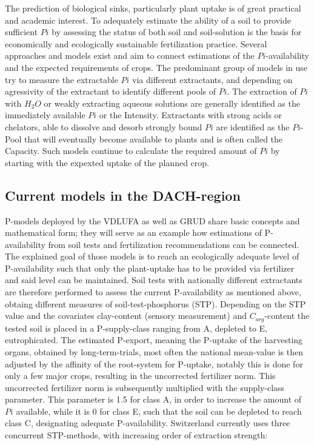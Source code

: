 \documentclass[
  letterpaper,
  DIV=11,
  numbers=noendperiod]{scrartcl}
\begin{document}
The prediction of biological sinks, particularly plant uptake is of
great practical and academic interest. To adequately estimate the
ability of a soil to provide sufficient \(Pi\) by assessing the status
of both soil and soil-solution is the basis for economically and
ecologically sustainable fertilization practice. Several approaches and
models exist and aim to connect estimations of the \(Pi\)-availability
and the expected requirements of crops. The predominant group of models
in use try to measure the extractable \(Pi\) via different extractants,
and depending on agressivity of the extractant to identify different
pools of \(Pi\). The extraction of \(Pi\) with \(H_2O\) or weakly
extracting aqueous solutions are generally identified as the immediately
available \(Pi\) or the Intensity. Extractants with strong acids or
chelators, able to dissolve and desorb strongly bound \(Pi\) are
identified as the \(Pi\)-Pool that will eventually become available to
plants and is often called the Capacity. Such models continue to
calculate the required amount of \(Pi\) by starting with the expexted
uptake of the planned crop.

\subsection{Current models in the
DACH-region}\label{current-models-in-the-dach-region}

P-models deployed by the VDLUFA as well as GRUD share basic concepts and
mathematical form; they will serve as an example how estimations of
P-availability from soil tests and fertilization recommendations can be
connected. The explained goal of those models is to reach an
ecologically adequate level of P-availability such that only the
plant-uptake has to be provided via fertilizer and said level can be
maintained. Soil tests with nationally different extractants are
therefore performed to assess the current P-availability as mentioned
above, obtaing different measures of soil-test-phosphorus (STP).
Depending on the STP value and the covariates clay-content (sensory
measurement) and \(C_{org}\)-content the tested soil is placed in a
P-supply-class ranging from A, depleted to E, eutrophicated. The
estimated P-export, meaning the P-uptake of the harvesting organs,
obtained by long-term-trials, most often the national mean-value is then
adjusted by the affinity of the root-system for P-uptake, notably this
is done for only a few major crops, resulting in the uncorrected
fertilizer norm. This uncorrected fertilizer norm is subsequently
multiplied with the supply-class parameter. This parameter is 1.5 for
class A, in order to increase the amount of \(Pi\) available, while it
is 0 for class E, such that the soil can be depleted to reach class C,
designating adequate P-availability. Switzerland currently uses three
concurrent STP-methods, with increasing order of extraction strength:
\end{document}
